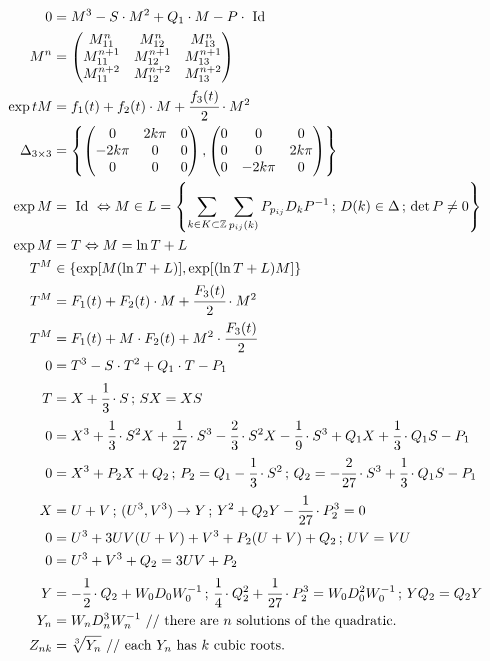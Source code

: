 \documentclass[12pt,a4paper]{article}
\begin{document}
\begin{align}
  0 &= M^3 - S\cdot M^2 + Q_1\cdot M - P\cdot\text{ Id } \\
  M^n &= \begin{pmatrix} M_{11}^n & M_{12}^n & M_{13}^n \\ M^{n+1}_{11} & M^{n+1}_{12} & M^{n+1}_{13} \\ M^{n+2}_{11} & M^{n+2}_{12} & M^{n+2}_{13} \end{pmatrix} \\
  \exp tM &= f_1(t) + f_2(t) \cdot M + \cfrac{f_3(t)}{2} \cdot M^2 \\
  \Delta_{3 \times 3} &= \left\{ \left( \begin{matrix} 0 & 2k\pi & 0 \\ -2k\pi & 0 & 0 \\ 0 & 0 & 0 \end{matrix}\right), \left( \begin{matrix} 0 & 0 & 0 \\ 0 & 0 & 2k\pi \\ 0 & -2k\pi & 0 \end{matrix}\right)  \right\} \\
  \exp M &= \text{ Id } \Leftrightarrow M \in L = \left\{ \sum_{k \in K \subset \mathbb{Z}} \sum_{p_{ij}(k)} P_{p_{ij}} D_k P^{-1} \,;\, D(k) \in \Delta\,;\,\det P \ne 0 \right\} \\
  \exp M &= T \Leftrightarrow M = \ln T + L \\
  T^M &\in \{ \exp [M (\ln T + L)], \exp [(\ln T + L) M] \} \\
  T^M &= F_1(t) + F_2(t) \cdot M + \cfrac{F_3(t)}{2} \cdot M^2 \\
  T^M &= F_1(t) + M \cdot F_2(t) + M^2 \cdot \cfrac{F_3(t)}{2} \\
  0 &= T^3 - S\cdot T^2 + Q_1\cdot T - P_1 \\
  T &= X + \cfrac{1}{3}\cdot S\,;\,SX = XS \\
  0 &= X^3 + \cfrac{1}{3}\cdot S^2 X + \cfrac{1}{27}\cdot S^3 - \cfrac{2}{3}\cdot S^2 X - \cfrac{1}{9}\cdot S^3 + Q_1X + \cfrac{1}{3}\cdot Q_1S  - P_1 \\
  0 &= X^3 + P_2 X + Q_2\,;\,P_2 = Q_1 -\cfrac{1}{3}\cdot S^2\,;\,Q_2=  - \cfrac{2}{27}\cdot S^3 + \cfrac{1}{3}\cdot Q_1S - P_1 \\
  X &= U + V\,;\,(U^3,V^3)\to Y\,;\,Y^2 + Q_2Y - \cfrac{1}{27}\cdot P_2^3 = 0 \\
  0 &= U^3 + 3UV(U + V) + V^3 + P_2(U + V) + Q_2\,;\,UV = VU \\
  0 &= U^3 + V^3 + Q_2 = 3UV + P_2 \\
  Y &= -\cfrac{1}{2}\cdot  Q_2 + W_0D_0W_0^{-1}\,;\,\cfrac{1}{4}\cdot Q_2^2 + \cfrac{1}{27}\cdot P_2^3 = W_0D_0^2W_0^{-1}\,;\,YQ_2 = Q_2Y \\
  Y_n &= W_n D_n^3 W_n^{-1} \text{ // there are }n\text{ solutions of the quadratic.} \\
  Z_{nk} &= \sqrt[3]{Y_n} \text{ // each }Y_n\text{ has }k\text{ cubic roots.}
\end{align}
\end{document}

